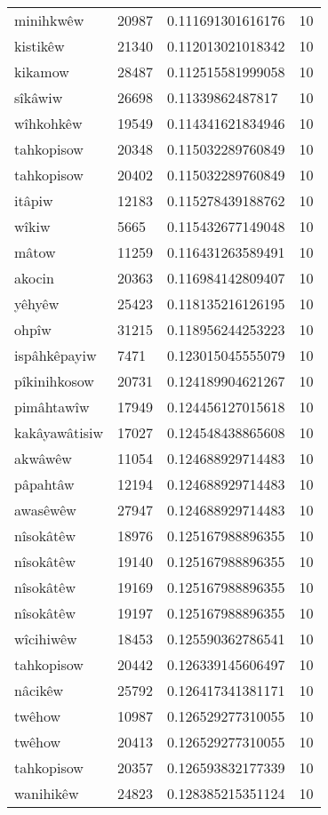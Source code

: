 \begin{longtable}{llll}
minihkwêw & 20987 & 0.111691301616176 & 10 \\
kistikêw & 21340 & 0.112013021018342 & 10 \\
kikamow & 28487 & 0.112515581999058 & 10 \\
sîkâwiw & 26698 & 0.11339862487817 & 10 \\
wîhkohkêw & 19549 & 0.114341621834946 & 10 \\
tahkopisow & 20348 & 0.115032289760849 & 10 \\
tahkopisow & 20402 & 0.115032289760849 & 10 \\
itâpiw & 12183 & 0.115278439188762 & 10 \\
wîkiw & 5665 & 0.115432677149048 & 10 \\
mâtow & 11259 & 0.116431263589491 & 10 \\
akocin & 20363 & 0.116984142809407 & 10 \\
yêhyêw & 25423 & 0.118135216126195 & 10 \\
ohpîw & 31215 & 0.118956244253223 & 10 \\
ispâhkêpayiw & 7471 & 0.123015045555079 & 10 \\
pîkinihkosow & 20731 & 0.124189904621267 & 10 \\
pimâhtawîw & 17949 & 0.124456127015618 & 10 \\
kakâyawâtisiw & 17027 & 0.124548438865608 & 10 \\
akwâwêw & 11054 & 0.124688929714483 & 10 \\
pâpahtâw & 12194 & 0.124688929714483 & 10 \\
awasêwêw & 27947 & 0.124688929714483 & 10 \\
nîsokâtêw & 18976 & 0.125167988896355 & 10 \\
nîsokâtêw & 19140 & 0.125167988896355 & 10 \\
nîsokâtêw & 19169 & 0.125167988896355 & 10 \\
nîsokâtêw & 19197 & 0.125167988896355 & 10 \\
wîcihiwêw & 18453 & 0.125590362786541 & 10 \\
tahkopisow & 20442 & 0.126339145606497 & 10 \\
nâcikêw & 25792 & 0.126417341381171 & 10 \\
twêhow & 10987 & 0.126529277310055 & 10 \\
twêhow & 20413 & 0.126529277310055 & 10 \\
tahkopisow & 20357 & 0.126593832177339 & 10 \\
wanihikêw & 24823 & 0.128385215351124 & 10 \\

\end{longtable}

